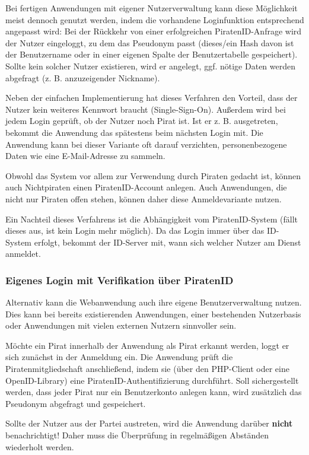 Bei fertigen Anwendungen mit eigener Nutzerverwaltung kann diese Möglichkeit meist dennoch genutzt werden, indem die vorhandene Loginfunktion entsprechend angepasst wird:
Bei der Rückkehr von einer erfolgreichen PiratenID-Anfrage wird der Nutzer eingeloggt, zu dem das Pseudonym passt
(dieses/ein Hash davon ist der Benutzername oder in einer eigenen Spalte der Benutzertabelle gespeichert).
Sollte kein solcher Nutzer existieren, wird er angelegt, ggf. nötige Daten werden abgefragt (z. B. anzuzeigender Nickname).

Neben der einfachen Implementierung hat dieses Verfahren den Vorteil, dass der Nutzer kein weiteres Kennwort braucht (Single-Sign-On).
Außerdem wird bei jedem Login geprüft, ob der Nutzer noch Pirat ist. Ist er z. B. ausgetreten, bekommt die Anwendung das spätestens beim nächsten Login mit.
Die Anwendung kann bei dieser Variante oft darauf verzichten, personenbezogene Daten wie eine E-Mail-Adresse zu sammeln.

Obwohl das System vor allem zur Verwendung durch Piraten gedacht ist, können auch Nichtpiraten einen PiratenID-Account anlegen.
Auch Anwendungen, die nicht nur Piraten offen stehen, können daher diese Anmeldevariante nutzen.

Ein Nachteil dieses Verfahrens ist die Abhängigkeit vom PiratenID-System (fällt dieses aus, ist kein Login mehr möglich).
Da das Login immer über das ID-System erfolgt, bekommt der ID-Server mit, wann sich welcher Nutzer am Dienst anmeldet.


\subsubsection{Eigenes Login mit Verifikation über PiratenID}
Alternativ kann die Webanwendung auch ihre eigene Benutzerverwaltung nutzen.
Dies kann bei bereits existierenden Anwendungen, einer bestehenden Nutzerbasis oder Anwendungen mit vielen externen Nutzern sinnvoller sein.

Möchte ein Pirat innerhalb der Anwendung als Pirat erkannt werden, loggt er sich zunächst in der Anmeldung ein.
Die Anwendung prüft die Piratenmitgliedschaft anschließend, indem sie (über den PHP-Client oder eine OpenID-Library) eine PiratenID-Authentifizierung durchführt.
Soll sichergestellt werden, dass jeder Pirat nur ein Benutzerkonto anlegen kann, wird zusätzlich das Pseudonym abgefragt und gespeichert.

Sollte der Nutzer aus der Partei austreten, wird die Anwendung darüber \textbf{nicht} benachrichtigt!
Daher muss die Überprüfung in regelmäßigen Abständen wiederholt werden.

